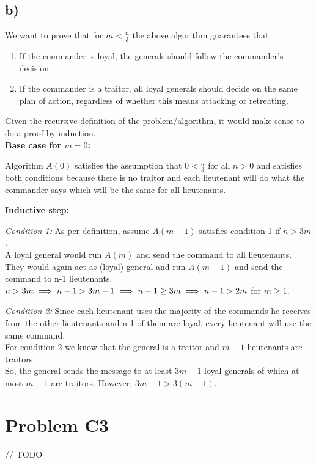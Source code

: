 \documentclass[12pt]{article}
\begin{document}
\subsection*{b)}
We want to prove that for $m < \frac{n}{3}$ the above algorithm guarantees that:
\begin{enumerate}
\item If the commander is loyal, the generals should follow the commander's decision.
\item If the commander is a traitor, all loyal generals should decide on the same plan of action, regardless of whether this means attacking or retreating.
\end{enumerate}
Given the recursive definition of the problem/algorithm, it would make sense to do a proof by induction.\\

\textbf{Base case for $m=0$:} 

Algorithm $A(0)$ satisfies the assumption that $0 < \frac{n}{3}$ for all $n>0$ and satisfies both conditions because there is no traitor and each lieutenant will do what the commander says which will be the same for all lieutenants.

\textbf{Inductive step:}

\textit{Condition 1:} As per definition, assume $A(m-1)$ satisfies condition 1 if $n > 3m$.\\
A loyal general would run $A(m)$ and send the command to all lieutenants.\\
They would again act as (loyal) general and run $A(m-1)$ and send the command to n-1 lieutenants.\\
$n>3m\\
\implies n-1>3m-1 \\
\implies n-1\geq3m \\
\implies n-1>2m$ for $m\geq1$.

\textit{Condition 2:} Since each lieutenant uses the majority of the commands he receives from the other lieutenants and n-1 of them are loyal, every lieutenant will use the same command.\\
For condition 2 we know that the general is a traitor and $m-1$ lieutenants are traitors.\\
So, the general sends the message to at least $3m-1$ loyal generals of which at most $m-1$ are traitors. However, $3m-1 > 3(m-1)$. 

\section*{Problem C3}
// TODO
\end{document}
